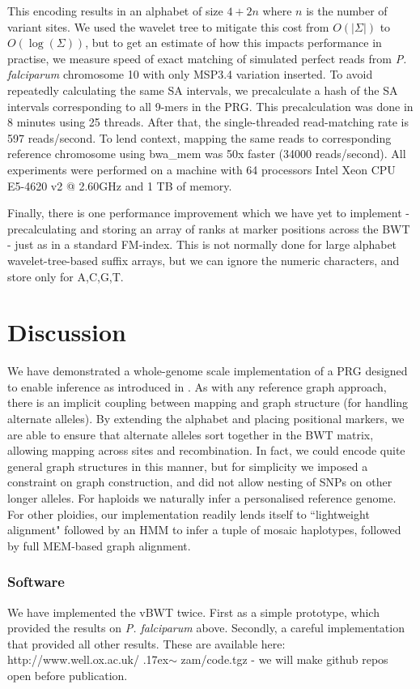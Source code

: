 \documentclass[runningheads,a4paper]{llncs}
\begin{document}
This encoding results in an alphabet of size $4+2n$ where $n$ is the number of variant sites. We used the wavelet tree to mitigate this cost from $O(|\Sigma|)$ to $O(\log(\Sigma))$, but to get an estimate of how this impacts performance in practise, we measure speed of exact matching of simulated perfect reads from \textit{P. falciparum} chromosome 10 with only MSP3.4 variation inserted. To avoid repeatedly calculating the same SA intervals, we precalculate a hash of the  SA intervals corresponding to all 9-mers in the PRG. This precalculation was done in 8 minutes using 25 threads. After that, the single-threaded read-matching rate is 597 reads/second. To lend context, mapping the same reads to corresponding reference chromosome using bwa\_mem was 50x faster (34000 reads/second). All experiments were performed on a machine with 64 processors Intel Xeon CPU E5-4620 v2 @ 2.60GHz and 1 TB of memory.

Finally, there is one performance improvement which we have yet to implement - precalculating and storing an array of ranks at marker positions across the BWT - just as in a standard FM-index. This is not normally done for large alphabet wavelet-tree-based suffix arrays, but we can ignore the numeric characters, and store only for A,C,G,T. 

\section{Discussion}
We have demonstrated a whole-genome scale implementation of a PRG designed to enable inference as introduced in \cite{dilthey}. As with any reference graph approach, there is an implicit coupling between mapping and graph structure (for handling alternate alleles). By extending the alphabet and placing positional markers, we are able to ensure that alternate alleles sort together in the BWT matrix, allowing mapping across sites and recombination. In fact, we could encode quite general graph structures in this manner, but for simplicity we imposed a constraint on graph construction, and did not allow nesting of SNPs on other longer alleles. For haploids we naturally infer a personalised reference genome. For other ploidies, our implementation readily lends itself to ``lightweight alignment" followed by an HMM to infer a tuple of mosaic haplotypes, followed by full MEM-based graph alignment.  





\subsubsection{Software}
We have implemented the vBWT twice. First as a simple prototype, which provided the results on \textit{P. falciparum} above. Secondly,  a careful implementation that provided all other results. These are available here: http://www.well.ox.ac.uk/ {\raise.17ex\hbox{$\scriptstyle\sim$}} zam/code.tgz -  we will make github repos open before publication. 
\end{document}
